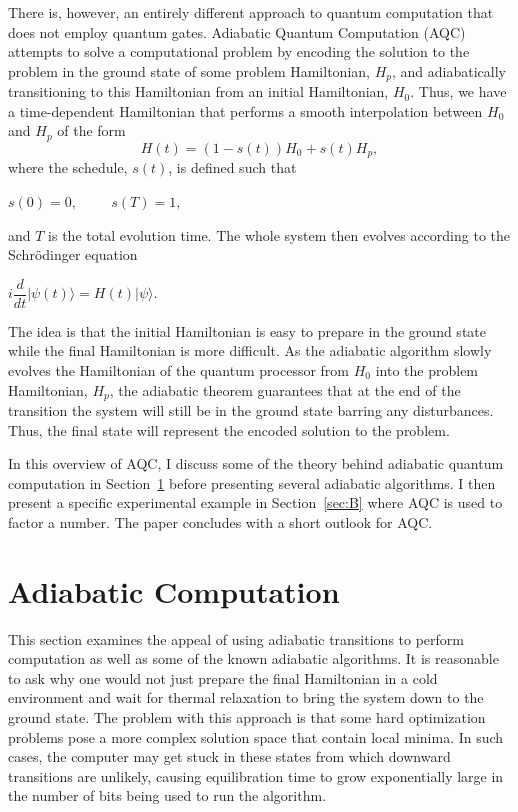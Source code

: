 \documentclass[%
 reprint,
 amsmath,amssymb,
 aps,
]{revtex4-1}
\begin{document}
   There is, however, an entirely different approach to quantum computation that does not employ quantum gates. Adiabatic Quantum Computation (AQC) attempts to solve a computational problem by encoding the solution to the problem in the ground state of some problem Hamiltonian, $H_p$, and adiabatically transitioning to this Hamiltonian from an initial Hamiltonian, $H_0$\cite{RevModPhys.90.015002}. Thus, we have a time-dependent Hamiltonian that performs a smooth interpolation between $H_0$ and $H_p$ of the form 
	\begin{equation}
		H(t) = (1-s(t))H_0 + s(t)H_p, 
		\label{eq:Ht}
	\end{equation}
where the schedule, $s(t)$, is defined such that
	\begin{center}
		$s(0) = 0, \hspace{1cm} s(T) = 1,$
	\end{center}
and $T$ is the total evolution time. The whole system then evolves according to the Schr{\"o}dinger equation
 	\begin{center}
		$i\dfrac{d}{dt}\vert\psi(t)\rangle = H(t)\vert\psi\rangle$.
	\end{center}
	
   The idea is that the initial Hamiltonian is easy to prepare in the ground state while the final Hamiltonian is more difficult. As the adiabatic algorithm slowly evolves the Hamiltonian of the quantum processor from $H_0$ into the problem Hamiltonian, $H_p$, the adiabatic theorem guarantees that at the end of the transition the system will still be in the ground state barring any disturbances. Thus, the final state will represent the encoded solution to the problem. 

   In this overview of AQC, I discuss some of the theory behind adiabatic quantum computation in Section~\ref{sec:A} before presenting several adiabatic algorithms. I then present a specific experimental example in Section~\ref{sec:B} where AQC is used to factor a number. The paper concludes with a short outlook for AQC.
   
   \section{Adiabatic Computation}\label{sec:A}
   
   This section examines the appeal of using adiabatic transitions to perform computation as well as some of the known adiabatic algorithms. It is reasonable to ask why one would not just prepare the final Hamiltonian in a cold environment and wait for thermal relaxation to bring the system down to the ground state. The problem with this approach is that some hard optimization problems pose a more complex solution space that contain local minima. In such cases, the computer may get stuck in these states from which downward transitions are unlikely, causing equilibration time to grow exponentially large in the number of bits being used to run the algorithm\citep{Childs2001}.
   
\end{document}
